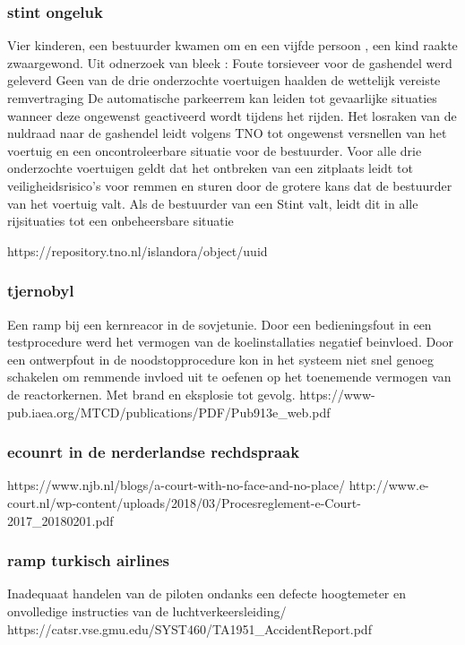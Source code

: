 \subsubsection{stint ongeluk}
Vier kinderen, een bestuurder kwamen om en een vijfde persoon , een kind raakte zwaargewond. Uit odnerzoek van bleek :
Foute torsieveer voor de gashendel werd geleverd
Geen van de drie onderzochte voertuigen haalden de wettelijk vereiste remvertraging
De automatische parkeerrem kan leiden tot gevaarlijke situaties wanneer deze ongewenst geactiveerd wordt tijdens het rijden. 
Het losraken van de nuldraad naar de gashendel leidt volgens TNO tot ongewenst versnellen van het voertuig en een oncontroleerbare situatie voor de bestuurder.
Voor alle drie onderzochte voertuigen geldt dat het ontbreken van een zitplaats leidt tot veiligheidsrisico’s voor remmen en sturen door de grotere kans dat de bestuurder van het voertuig valt. Als de bestuurder van een Stint valt, leidt dit in alle rijsituaties tot een onbeheersbare situatie


https://repository.tno.nl/islandora/object/uuid%


\subsubsection{tjernobyl}
Een ramp bij een kernreacor in de sovjetunie. Door een bedieningsfout in een testprocedure werd het vermogen van de koelinstallaties negatief beinvloed. Door een ontwerpfout in de noodstopprocedure kon in het systeem niet snel genoeg schakelen om remmende invloed uit te oefenen op het toenemende vermogen van de reactorkernen. Met brand en eksplosie tot gevolg.
https://www-pub.iaea.org/MTCD/publications/PDF/Pub913e_web.pdf 

\subsubsection{ecounrt in de nerderlandse rechdspraak}
https://www.njb.nl/blogs/a-court-with-no-face-and-no-place/ 
http://www.e-court.nl/wp-content/uploads/2018/03/Procesreglement-e-Court-2017_20180201.pdf 




\subsubsection{ramp turkisch airlines}
Inadequaat handelen van de piloten ondanks een defecte hoogtemeter en onvolledige instructies van de luchtverkeersleiding/
https://catsr.vse.gmu.edu/SYST460/TA1951_AccidentReport.pdf 

